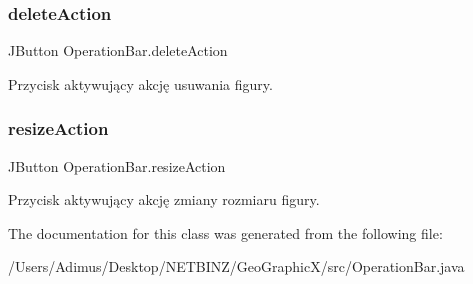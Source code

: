 \subsubsection{delete\+Action}
{\footnotesize\ttfamily J\+Button Operation\+Bar.\+delete\+Action}

Przycisk aktywujący akcję usuwania figury. \mbox{\label{class_operation_bar_a590fd08e1dd712cc1494cd9c6a5f0694}} 
\subsubsection{resize\+Action}
{\footnotesize\ttfamily J\+Button Operation\+Bar.\+resize\+Action}

Przycisk aktywujący akcję zmiany rozmiaru figury. 

The documentation for this class was generated from the following file\+:\begin{DoxyCompactItemize}
\item 
/\+Users/\+Adimus/\+Desktop/\+N\+E\+T\+B\+I\+N\+Z/\+Geo\+Graphic\+X/src/Operation\+Bar.\+java\end{DoxyCompactItemize}
